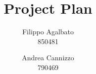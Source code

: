 \documentclass[a4paper]{report}
\begin{document}
\setcounter{tocdepth}{1}

\title{\Huge Project Plan}
\author{Filippo Agalbato \\ 850481 \and Andrea Cannizzo \\ 790469}
\maketitle

\tableofcontents





\appendix

\end{document}
